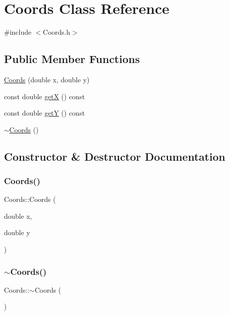 \hypertarget{class_coords}{}\section{Coords Class Reference}
\label{class_coords}


{\ttfamily \#include $<$Coords.\+h$>$}

\subsection*{Public Member Functions}
\begin{DoxyCompactItemize}
\item 
\mbox{\hyperlink{class_coords_accdf1503b400e149ee1c65fa2a61d9b8}{Coords}} (double x, double y)
\item 
const double \mbox{\hyperlink{class_coords_ace1df844690c765993d4aab4444dc3bb}{getX}} () const
\item 
const double \mbox{\hyperlink{class_coords_a97ee10f1880dca8a6139ab69e822d26f}{getY}} () const
\item 
\mbox{\hyperlink{class_coords_a475cfe7279f33a807a682d6fccb529dc}{$\sim$\+Coords}} ()
\end{DoxyCompactItemize}


\subsection{Constructor \& Destructor Documentation}
\mbox{\label{class_coords_accdf1503b400e149ee1c65fa2a61d9b8}} 
\subsubsection{\texorpdfstring{Coords()}{Coords()}}
{\footnotesize\ttfamily Coords\+::\+Coords (\begin{DoxyParamCaption}\item[{double}]{x,  }\item[{double}]{y }\end{DoxyParamCaption})}

\mbox{\label{class_coords_a475cfe7279f33a807a682d6fccb529dc}} 
\subsubsection{\texorpdfstring{$\sim$Coords()}{~Coords()}}
{\footnotesize\ttfamily Coords\+::$\sim$\+Coords (\begin{DoxyParamCaption}{ }\end{DoxyParamCaption})}



